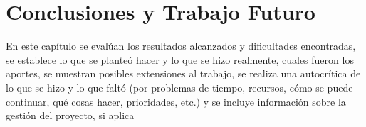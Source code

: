 \chapter{Conclusiones y Trabajo Futuro}

En este capítulo se evalúan los resultados alcanzados y
dificultades encontradas, se establece lo que se planteó hacer y lo que se hizo
realmente, cuales fueron los aportes, se muestran posibles extensiones al trabajo, se
realiza una autocrítica de lo que se hizo y lo que faltó (por problemas de tiempo,
recursos, cómo se puede continuar, qué cosas hacer, prioridades, etc.) y se incluye
información sobre la gestión del proyecto, si aplica